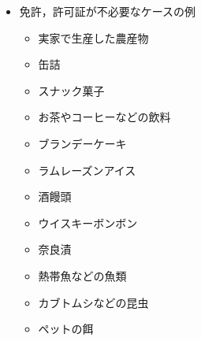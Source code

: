 \begin{itemize}
 \item	免許，許可証が不必要なケースの例
\begin{itemize}
\setlength{\parskip}{3mm}
 \item	実家で生産した農産物
 \item	缶詰
 \item	スナック菓子
 \item	お茶やコーヒーなどの飲料
 \item	ブランデーケーキ
 \item	ラムレーズンアイス
 \item	酒饅頭
 \item	ウイスキーボンボン
 \item	奈良漬
 \item	熱帯魚などの魚類
 \item	カブトムシなどの昆虫
 \item	ペットの餌
\end{itemize}
\end{itemize}

